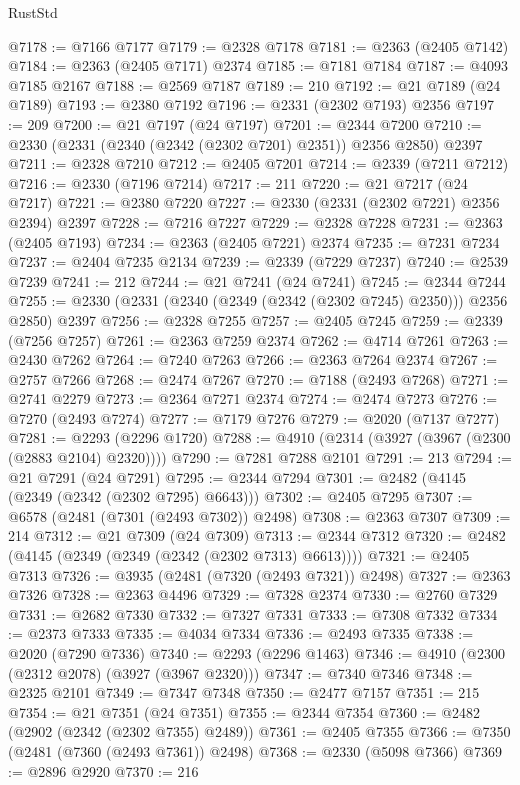 \begin{lexlean}{RustStd}
\begin{coremodule}
@7178 := @7166 @7177
@7179 := @2328 @7178
@7181 := @2363 (@2405 @7142)
@7184 := @2363 (@2405 @7171) @2374
@7185 := @7181 @7184
@7187 := @4093 @7185 @2167
@7188 := @2569 @7187
@7189 := 210
@7192 := @21 @7189 (@24 @7189)
@7193 := @2380 @7192
@7196 := @2331 (@2302 @7193) @2356
@7197 := 209
@7200 := @21 @7197 (@24 @7197)
@7201 := @2344 @7200
@7210 := @2330 (@2331 (@2340 (@2342 (@2302 @7201) @2351)) @2356 @2850) @2397
@7211 := @2328 @7210
@7212 := @2405 @7201
@7214 := @2339 (@7211 @7212)
@7216 := @2330 (@7196 @7214)
@7217 := 211
@7220 := @21 @7217 (@24 @7217)
@7221 := @2380 @7220
@7227 := @2330 (@2331 (@2302 @7221) @2356 @2394) @2397
@7228 := @7216 @7227
@7229 := @2328 @7228
@7231 := @2363 (@2405 @7193)
@7234 := @2363 (@2405 @7221) @2374
@7235 := @7231 @7234
@7237 := @2404 @7235 @2134
@7239 := @2339 (@7229 @7237)
@7240 := @2539 @7239
@7241 := 212
@7244 := @21 @7241 (@24 @7241)
@7245 := @2344 @7244
@7255 := @2330 (@2331 (@2340 (@2349 (@2342 (@2302 @7245) @2350))) @2356 @2850) @2397
@7256 := @2328 @7255
@7257 := @2405 @7245
@7259 := @2339 (@7256 @7257)
@7261 := @2363 @7259 @2374
@7262 := @4714 @7261
@7263 := @2430 @7262
@7264 := @7240 @7263
@7266 := @2363 @7264 @2374
@7267 := @2757 @7266
@7268 := @2474 @7267
@7270 := @7188 (@2493 @7268)
@7271 := @2741 @2279
@7273 := @2364 @7271 @2374
@7274 := @2474 @7273
@7276 := @7270 (@2493 @7274)
@7277 := @7179 @7276
@7279 := @2020 (@7137 @7277)
@7281 := @2293 (@2296 @1720)
@7288 := @4910 (@2314 (@3927 (@3967 (@2300 (@2883 @2104) @2320))))
@7290 := @7281 @7288 @2101
@7291 := 213
@7294 := @21 @7291 (@24 @7291)
@7295 := @2344 @7294
@7301 := @2482 (@4145 (@2349 (@2342 (@2302 @7295) @6643)))
@7302 := @2405 @7295
@7307 := @6578 (@2481 (@7301 (@2493 @7302)) @2498)
@7308 := @2363 @7307
@7309 := 214
@7312 := @21 @7309 (@24 @7309)
@7313 := @2344 @7312
@7320 := @2482 (@4145 (@2349 (@2349 (@2342 (@2302 @7313) @6613))))
@7321 := @2405 @7313
@7326 := @3935 (@2481 (@7320 (@2493 @7321)) @2498)
@7327 := @2363 @7326
@7328 := @2363 @4496
@7329 := @7328 @2374
@7330 := @2760 @7329
@7331 := @2682 @7330
@7332 := @7327 @7331
@7333 := @7308 @7332
@7334 := @2373 @7333
@7335 := @4034 @7334
@7336 := @2493 @7335
@7338 := @2020 (@7290 @7336)
@7340 := @2293 (@2296 @1463)
@7346 := @4910 (@2300 (@2312 @2078) (@3927 (@3967 @2320)))
@7347 := @7340 @7346
@7348 := @2325 @2101
@7349 := @7347 @7348
@7350 := @2477 @7157
@7351 := 215
@7354 := @21 @7351 (@24 @7351)
@7355 := @2344 @7354
@7360 := @2482 (@2902 (@2342 (@2302 @7355) @2489))
@7361 := @2405 @7355
@7366 := @7350 (@2481 (@7360 (@2493 @7361)) @2498)
@7368 := @2330 (@5098 @7366)
@7369 := @2896 @2920
@7370 := 216

\end{coremodule}
\end{lexlean}
